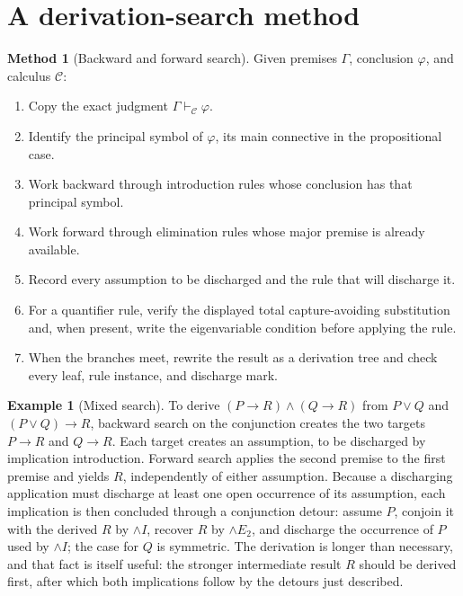 \documentclass[11pt,oneside,openany]{book}
\theoremstyle{definition}
\newtheorem{example}[definition]{Example}
\newtheorem{method}[definition]{Method}
\theoremstyle{plain}
\theoremstyle{remark}
\newcommand{\derives}{\vdash}
\begin{document}
\section{A derivation-search method}
\label{sec:formal-practice-01}

\begin{method}[Backward and forward search]
Given premises \(\Gamma\), conclusion \(\varphi\), and calculus
\(\mathcal C\):
\begin{enumerate}
  \item Copy the exact judgment \(\Gamma\derives_{\mathcal C}\varphi\).
  \item Identify the principal symbol of \(\varphi\), its main
        connective in the propositional case.
  \item Work backward through introduction rules whose conclusion has that
        principal symbol.
  \item Work forward through elimination rules whose major premise is already
        available.
  \item Record every assumption to be discharged and the rule that will
        discharge it.
  \item For a quantifier rule, verify the displayed total capture-avoiding
        substitution and, when present, write the eigenvariable condition
        before applying the rule.
  \item When the branches meet, rewrite the result as a derivation tree and
        check every leaf, rule instance, and discharge mark.
\end{enumerate}
\end{method}

\begin{example}[Mixed search]
To derive \((P\to R)\land(Q\to R)\) from \(P\lor Q\) and
\((P\lor Q)\to R\), backward search on the conjunction creates the two targets
\(P\to R\) and \(Q\to R\).  Each target creates an assumption, to be
discharged by
implication introduction.  Forward search applies the second premise to the
first premise and yields \(R\), independently of either assumption.
Because a discharging application must discharge at least one open
occurrence of its assumption, each implication is then concluded through
a conjunction detour: assume \(P\), conjoin it with the derived \(R\) by
\(\land I\), recover \(R\) by \(\land E_2\), and discharge the occurrence
of \(P\) used by \(\land I\); the case for \(Q\) is symmetric.  The
derivation is longer than
necessary, and that fact is itself useful: the stronger intermediate result
\(R\) should be derived first, after which both implications follow by
the detours just described.
\end{example}
\end{document}
